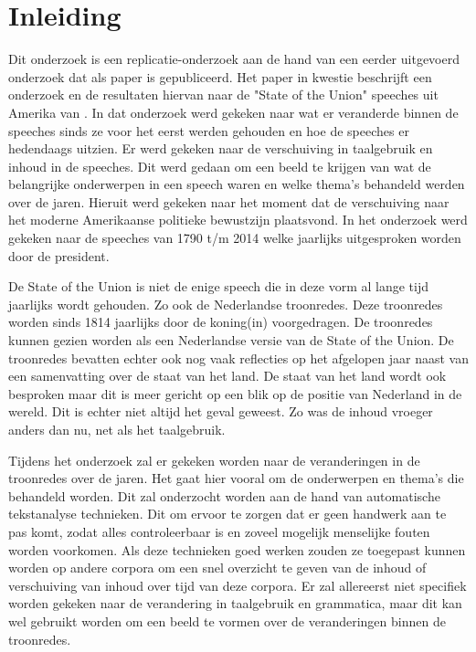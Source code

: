\section{Inleiding}
\label{sec:intro}
\begin{flushleft}
Dit onderzoek is een replicatie-onderzoek aan de hand van een eerder uitgevoerd onderzoek dat als paper is gepubliceerd. Het paper in kwestie beschrijft een onderzoek en de resultaten hiervan naar de "State of the Union" speeches uit Amerika van \cite{state}. In dat onderzoek werd gekeken naar wat er veranderde binnen de speeches sinds ze voor het eerst werden gehouden en hoe de speeches er hedendaags uitzien. Er werd gekeken naar de verschuiving in taalgebruik en inhoud in de speeches. Dit werd gedaan om een beeld te krijgen van wat de belangrijke onderwerpen in een speech waren en welke thema's behandeld werden over de jaren. Hieruit werd gekeken naar het moment dat de verschuiving naar het moderne Amerikaanse politieke bewustzijn plaatsvond. In het onderzoek werd gekeken naar de speeches van 1790 t/m 2014 welke jaarlijks uitgesproken worden door de president.

De State of the Union is niet de enige speech die in deze vorm al lange tijd jaarlijks wordt gehouden. Zo ook de Nederlandse troonredes. Deze troonredes worden sinds 1814 jaarlijks door de koning(in) voorgedragen. De troonredes kunnen gezien worden als een Nederlandse versie van de State of the Union. De troonredes bevatten echter ook nog vaak reflecties op het afgelopen jaar naast van een samenvatting over de staat van het land. De staat van het land wordt ook besproken maar dit is meer gericht op een blik op de positie van Nederland in de wereld. Dit is echter niet altijd het geval geweest. Zo was de inhoud vroeger anders dan nu, net als het taalgebruik.

Tijdens het onderzoek zal er gekeken worden naar de veranderingen in de troonredes over de jaren. Het gaat hier vooral om de onderwerpen en thema's die behandeld worden. Dit zal onderzocht worden aan de hand van automatische tekstanalyse technieken. Dit om ervoor te zorgen dat er geen handwerk aan te pas komt, zodat alles controleerbaar is en zoveel mogelijk menselijke fouten worden voorkomen. Als deze technieken goed werken zouden ze toegepast kunnen worden op andere corpora om een snel overzicht te geven van de inhoud of verschuiving van inhoud over tijd van deze corpora. Er zal allereerst niet specifiek worden gekeken naar de verandering in taalgebruik en grammatica, maar dit kan wel gebruikt worden om een beeld te vormen over de veranderingen binnen de troonredes.


\end{flushleft}
